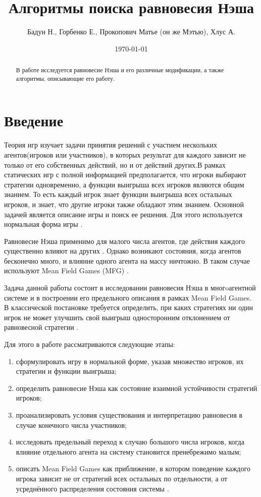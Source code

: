 \documentclass[a4paper,11pt]{article}
\title{Алгоритмы поиска равновесия Нэша}
\author{Бадун Н., Горбенко Е., Прокопович Матье (он же Мэтью), Хлус А.} %
\date{\today}
\begin{document}
\maketitle

\begin{abstract}
    В работе исследуется равновесие Нэша и его различные модификации, а также алгоритмы, описывающие его работу.
\end{abstract}

\section{Введение}

Теория игр изучает задачи принятия решений с участием нескольких агентов(игроков или участников), в которых результат для каждого зависит не только от его собственных действий, но и от действий других.В рамках статических игр с полной информацией предполагается, что игроки выбирают стратегии одновременно, а функции выигрыша всех игроков являются общим знанием. То есть каждый игрок знает функции выигрыша всех остальных игроков, и знает, что другие игроки также обладают этим знанием. Основной задачей является описание игры и поиск ее решения. Для этого используется нормальная форма игры \cite{gibbons1992game}.

Равновесие Нэша применимо для малого числа агентов, где действия каждого существенно влияют на других \cite{nash1951}. Однако возникают состояния, когда агентов бесконечно много, и влияние одного агента на массу ничтожно. В таком случае используют Mean Field Games (MFG) \cite{cardaliaguet2013notes}.

Задача данной работы состоит в исследовании равновесия Нэша в многoагентной системе и в построении его предельного описания в рамках Mean Field Games. В классической постановке требуется определить, при каких стратегиях ни один игрок не может улучшить свой выигрыш односторонним отклонением от равновесной стратегии \cite{gibbons1992game, nash1951}.

Для этого в работе рассматриваются следующие этапы:
\begin{enumerate}
    \item сформулировать игру в нормальной форме, указав множество игроков, их стратегии и функции выигрыша;
    \item определить равновесие Нэша как состояние взаимной устойчивости стратегий игроков;
    \item проанализировать условия существования и интерпретацию равновесия в случае конечного числа участников;
    \item исследовать предельный переход к случаю большого числа игроков, когда влияние отдельного агента на систему становится пренебрежимо малым;
    \item описать Mean Field Games как приближение, в котором поведение каждого игрока зависит не от стратегий всех остальных по отдельности, а от усреднённого распределения состояния системы \cite{cardaliaguet2013notes}.
\end{enumerate}
\end{document}
